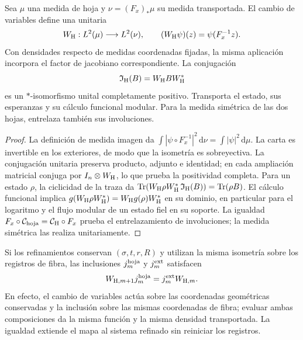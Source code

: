 \begin{proposition}
\label{vii:prop:transporte-unitario-horizonte}
Sea \(\mu\) una medida de hoja y \(\nu=(F_x)_*\mu\) su medida
transportada. El cambio de variables define una unitaria
\begin{equation}
 W_{\rm H}:L^2(\mu)\longrightarrow L^2(\nu),\qquad
 (W_{\rm H}\psi)(z)=\psi(F_x^{-1}z).
 \label{vii:eq:unitaria-horizonte}
\end{equation}
Con densidades respecto de medidas coordenadas fijadas, la misma
aplicación incorpora el factor de jacobiano correspondiente.
La conjugación
\begin{equation}
 \mathfrak I_{\rm H}(B)=W_{\rm H}BW_{\rm H}^*
 \label{vii:eq:mapa-observables-horizonte}
\end{equation}
es un \(*\)-isomorfismo unital completamente positivo. Transporta el
estado, sus esperanzas y su cálculo funcional modular. Para la medida
simétrica de las dos hojas, entrelaza también sus involuciones.
\end{proposition}
\begin{proof}
La definición de medida imagen da
\(\int|\psi\circ F_x^{-1}|^2\,\mathrm d\nu
=\int|\psi|^2\,\mathrm d\mu\).
La carta es invertible en los exteriores, de modo que la isometría es
sobreyectiva. La conjugación unitaria preserva producto, adjunto e
identidad; en cada ampliación matricial conjuga por
\(I_n\otimes W_{\rm H}\), lo que prueba la positividad completa.
Para un estado \(\rho\), la ciclicidad de la traza da
\(\operatorname{Tr}(W_{\rm H}\rho W_{\rm H}^*
\,\mathfrak I_{\rm H}(B))=\operatorname{Tr}(\rho B)\).
El cálculo funcional implica
\(g(W_{\rm H}\rho W_{\rm H}^*)=W_{\rm H}g(\rho)W_{\rm H}^*\)
en su dominio, en particular para el logaritmo y el flujo modular de
un estado fiel en su soporte. La igualdad
\(F_x\circ\mathcal C_{\rm hoja}=\mathcal C_{\rm H}\circ F_x\)
prueba el entrelazamiento de involuciones; la medida simétrica las realiza
unitariamente.
\end{proof}

Si los refinamientos conservan \((\sigma,t,r,R)\) y utilizan la misma
isometría sobre los registros de fibra, las inclusiones
\(j_m^{\rm hoja}\) y \(j_m^{\rm ext}\) satisfacen
\begin{equation}
 W_{{\rm H},m+1}j_m^{\rm hoja}
 =j_m^{\rm ext}W_{{\rm H},m}.
 \label{vii:eq:naturalidad-horizonte}
\end{equation}
En efecto, el cambio de variables actúa sobre las coordenadas geométricas
conservadas y la inclusión sobre las mismas coordenadas de fibra; evaluar
ambas composiciones da la misma función y la misma densidad transportada.
La igualdad extiende el mapa al sistema refinado sin reiniciar los registros.

